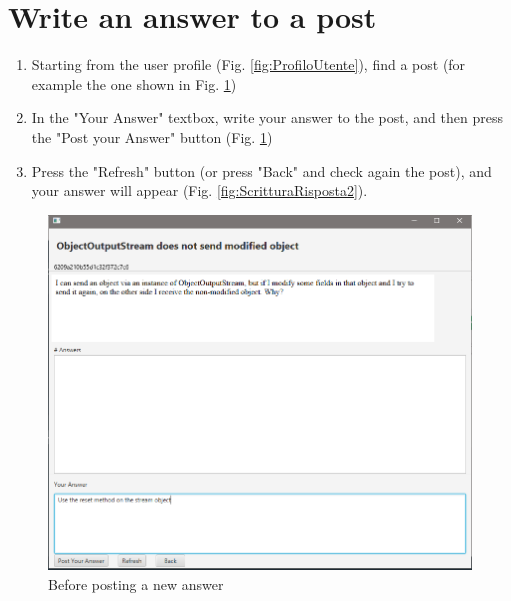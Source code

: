 \documentclass[11pt]{report}
\begin{document}
\section{Write an answer to a post}
\begin{enumerate}
    \item Starting from the user profile (Fig. \ref{fig:ProfiloUtente}), find a post (for example the one shown in Fig. \ref{fig:ScritturaRisposta1})
    \item In the "Your Answer" textbox, write your answer to the post, and then press the "Post your Answer" button (Fig. \ref{fig:ScritturaRisposta1})
    \item Press the "Refresh" button (or press "Back" and check again the post), and your answer will appear (Fig. \ref{fig:ScritturaRisposta2}).
\end{enumerate}
\begin{figure}[H]
  \centering
  \includegraphics[width=\textwidth,keepaspectratio=true]{img/user_manual/ScritturaRisposta1.png}
  \caption{Before posting a new answer}
  \label{fig:ScritturaRisposta1}
\end{figure}
\end{document}
